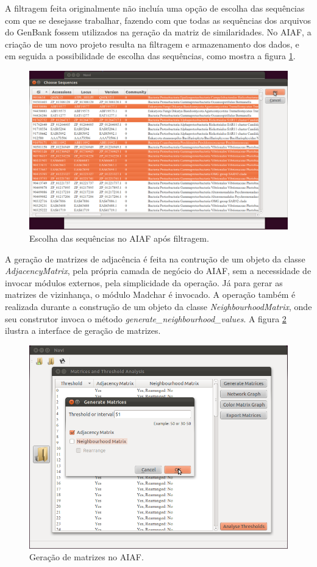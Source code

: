A filtragem feita originalmente não incluía uma opção de escolha das sequências com que se desejasse trabalhar, fazendo com que todas as sequências dos
arquivos do GenBank fossem utilizados na geração da matriz de similaridades. No AIAF, a criação de um novo projeto resulta
na filtragem e armazenamento dos dados, e em seguida a possibilidade de escolha das sequências, como mostra a figura \ref{fig:choose-sequences}.

\begin{figure}
\centering
\includegraphics[scale=0.38]{choose-sequences}
\caption{Escolha das sequências no AIAF após filtragem.}
\label{fig:choose-sequences}
\end{figure}

A geração de matrizes de adjacência é feita na contrução de um objeto da classe \textit{AdjacencyMatrix}, pela própria camada de negócio do AIAF, sem a
necessidade de invocar módulos externos, pela simplicidade da operação. Já para gerar as matrizes de vizinhança, o módulo Madchar é invocado. A operação
também é realizada durante a construção de um objeto da classe \textit{NeighbourhoodMatrix}, onde seu construtor invoca o método
\textit{generate\_neighbourhood\_values}. A figura \ref{fig:generate-matrices} ilustra a interface de geração de matrizes.

\begin{figure}
\centering
\includegraphics[scale=0.38]{generate-matrices}
\caption{Geração de matrizes no AIAF.}
\label{fig:generate-matrices}
\end{figure}

